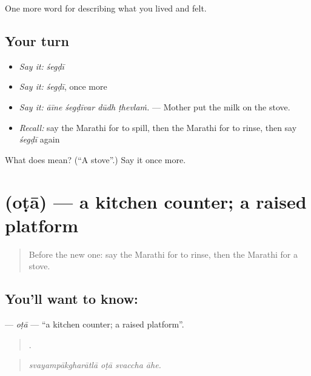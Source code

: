 \begin{grammarlens}[title={What you've built}]
One more word for describing what you lived and felt.
\end{grammarlens}

\subsection*{Your turn}
\begin{itemize}
\raggedright
  \item \emph{Say it:} \emph{śegḍī}
  \item \emph{Say it:} \emph{śegḍī}, once more
  \item \emph{Say it:} \emph{āīne śegḍīvar dūdh ṭhevlaṁ.} — Mother put the milk on the stove.
  \item \emph{Recall:} say the Marathi for to spill, then the Marathi for to rinse, then say \emph{śegḍī} again
\end{itemize}

\begin{tcolorbox}[breakable,colback=teal!4,colframe=teal!35!black,title={Before you move on}]
What does  mean? (\textquotedblleft{}A stove\textquotedblright{}.) Say it once more.
\end{tcolorbox}
\section[\texorpdfstring{\mr{ओटा} (oṭā)}{ओटा (oṭā)}]{ (oṭā) — a kitchen counter; a raised platform}

\label{lesson:MR-C526-ota}



\begin{quote}
Before the new one: say the Marathi for to rinse, then the Marathi for a stove.
\end{quote}

\subsection*{You'll want to know: }
\textbf{} — \emph{oṭā} — \textquotedblleft{}a kitchen counter; a raised platform\textquotedblright{}.

\begin{quote}
   .
\end{quote}

\begin{quote}
\emph{svayampākgharātlā oṭā svaccha āhe.}
\end{quote}

